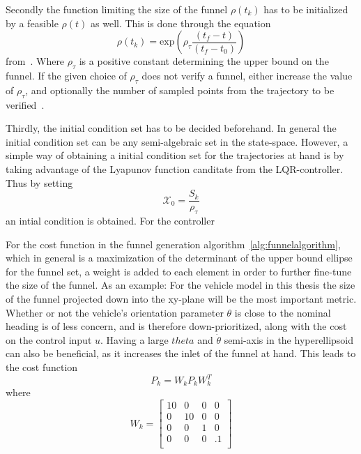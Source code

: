Secondly the function limiting the size of the funnel \(\rho(t_{k})\) has to be
initialized by a feasible \(\rho(t)\) as well. This is done through the equation
\begin{equation}
  \rho(t_{k}) = \mathrm{exp}\left( \rho_{\tau}\frac{\left( t_{f} - t \right)}{\left( t_{f} - t_{0}  \right)}\right)
\end{equation}
from~\cite[eq.~6.sec~3]{tobenkinInvariantFunnelsTrajectories2010}. Where
\(\rho_{\tau}\) is a positive constant determining the upper bound on the
funnel. If the given choice of \(\rho_{\tau}\) does not verify a funnel, either
increase the value of \(\rho_{\tau}\), and optionally the number of sampled
points from the trajectory to be
verified~\cite{tobenkinInvariantFunnelsTrajectories2010}.

Thirdly, the initial condition set has to be decided beforehand. In general the
initial condition set can be any semi-algebraic set in the state-space. However,
a simple way of obtaining a initial condition set for the trajectories at hand
is by taking advantage of the Lyapunov function canditate from the
\ac{LQR}-controller. Thus by setting
\begin{equation}
  \mathcal{X}_{0} = \frac{S_{k}}{\rho_{\tau}}
\end{equation}
an intial condition is obtained. For the controller

For the cost function in the funnel generation
algorithm~\ref{alg:funnelalgorithm}, which in general is a maximization of the
determinant of the upper bound ellipse for the funnel set, a weight is added to
each element in order to further fine-tune the size of the funnel. As an
example: For the vehicle model in this thesis the size of the funnel projected
down into the xy-plane will be the most important metric. Whether or not the
vehicle's orientation parameter \(\theta\) is close to the nominal heading is of
less concern, and is therefore down-prioritized, along with the cost on the
control input \(u\). Having a large \(theta\) and \(\dot{\theta}\) semi-axis in
the hyperellipsoid can also be beneficial, as it increases the inlet of the
funnel at hand. This leads to the cost function
\begin{equation}
  P_{k} = W_{k}P_{k}W_{k}^{T}
\end{equation}
where
\begin{equation}
  W_{k} =
  \begin{bmatrix}
    10 & 0 & 0 & 0 \\
    0 & 10 & 0 & 0 \\
    0 & 0 & 1 & 0 \\
    0 & 0 & 0 & .1 \\
  \end{bmatrix}
\end{equation}

